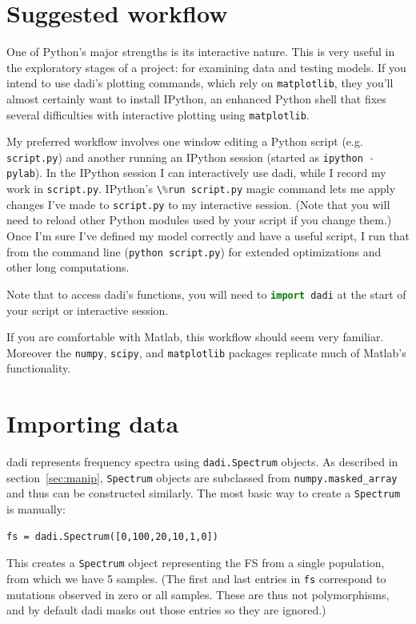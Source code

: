 \documentclass[12pt]{article}
\makeatletter
\newcommand{\dadi}{dadi\xspace}
\newcommand{\py}[1]{\lstinline[language=Python, showstringspaces=False]@#1@}
\makeatother
\begin{document}
\section{Suggested workflow}

One of Python's major strengths is its interactive nature.
This is very useful in the exploratory stages of a project: for examining data and testing models.
If you intend to use \dadi's plotting commands, which rely on \py{matplotlib}, they you'll almost certainly want to install IPython, an enhanced Python shell that fixes several difficulties with interactive plotting using \py{matplotlib}.

My preferred workflow involves one window editing a Python script (e.g. \py{script.py}) and another running an IPython session (started as \py{ipython -pylab}).
In the IPython session I can interactively use \dadi, while I record my work in \py{script.py}.
IPython's \py{\%run script.py} magic command lets me apply changes I've made to \py{script.py} to my interactive session.
(Note that you will need to reload other Python modules used by your script if you change them.)
Once I'm sure I've defined my model correctly and have a useful script, I run that from the command line (\py{python script.py}) for extended optimizations and other long computations.

Note that to access \dadi's functions, you will need to \py{import dadi} at the start of your script or interactive session.

If you are comfortable with Matlab, this workflow should seem very familiar.
Moreover the \py{numpy}, \py{scipy}, and \py{matplotlib} packages replicate much of Matlab's functionality.

\section{Importing data}

\dadi represents frequency spectra using \py{dadi.Spectrum} objects.
As described in section~\ref{sec:manip}, \py{Spectrum} objects are subclassed from \py{numpy.masked_array} and thus can be constructed similarly.
The most basic way to create a \py{Spectrum} is manually:
\begin{lstlisting}
fs = dadi.Spectrum([0,100,20,10,1,0])
\end{lstlisting}
This creates a \py{Spectrum} object representing the FS from a single population, from which we have 5 samples.
(The first and last entries in \py{fs} correspond to mutations observed in zero or all samples. These are thus not polymorphisms, and by default \dadi masks out those entries so they are ignored.)
\end{document}
